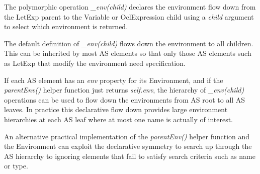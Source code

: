 \documentclass{llncs}
\begin{document}
The polymorphic operation \emph{\_env(child)} declares the environment flow down from the LetExp parent to the Variable or OclExpression child using a \emph{child} argument to select which environment is returned.

The default definition of \emph{\_env(child)} flows down the environment to all children. This can be inherited by most AS elements so that only those AS elements such as LetExp that modify the environment need specification.

If each AS element has an \emph{env} property for its Environment, and if the \emph{parentEnv()} helper function just returns \emph{self.env}, the hierarchy of \emph{\_env(child)} operations can be used to flow down the environments from AS root to all AS leaves. In practice this declarative flow down provides large environment hierarchies at each AS leaf where at most one name is actually of interest.

An alternative practical implementation of  the \emph{parentEnv()} helper function and the Environment can exploit the declarative symmetry to search up through the AS hierarchy to ignoring elements that fail to satisfy search criteria such as name or type.
\end{document}
